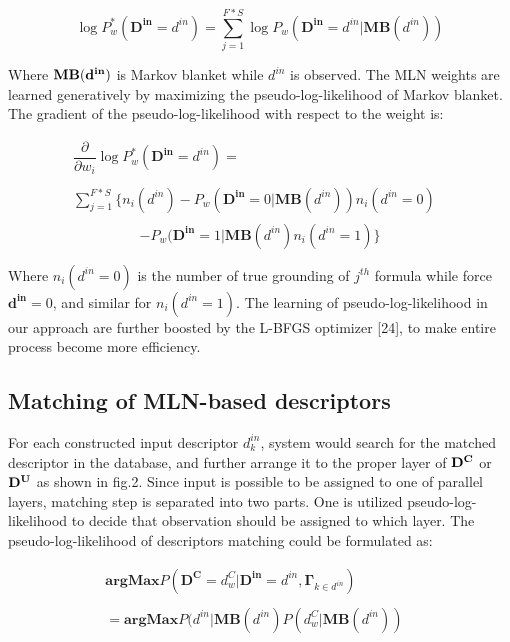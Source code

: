 \documentclass[journal]{IEEEtran}
\begin{document}
\begin{equation}
\log P^*_w(\mathbf{D^{in}} = d^{in}) = \sum_{j=1}^{F*S} \log P_{w}(\mathbf{D^{in}} = d^{in}|\mathbf{MB}(d^{in}))
\end{equation}

Where $\bf{MB}(d^{in})$ is Markov blanket while $d^{in}$ is observed. The MLN weights are learned generatively by maximizing the pseudo-log-likelihood of Markov blanket. The gradient of the pseudo-log-likelihood with respect to the weight is:

\begin{displaymath}
\begin{array}{ll}
\dfrac{\partial}{\partial w_i}\log P^*_w(\mathbf{D^{in}} = d^{in})= &\\\\
\sum^{F*S}_{j=1}\{n_i(d^{in})-P_w(\mathbf{D^{in}}=0|\mathbf{MB}(d^{in}))n_i(d^{in}=0) &\\
\end{array}
\end{displaymath}
\begin{equation}
-P_w(\mathbf{D^{in}}=1|\mathbf{MB}(d^{in})n_i(d^{in}=1)\}
\end{equation}

Where $n_i(d^{in}=0)$ is the number of true grounding of $j^{th}$ formula while force $\mathbf{d^{in}}=0$, and similar for $n_i(d^{in}=1)$. The learning of pseudo-log-likelihood in our approach are further boosted by the L-BFGS optimizer [24], to make entire process become more efficiency.

\subsection{Matching of MLN-based descriptors}
For each constructed input descriptor $d^{in}_k$, system would search for the matched descriptor in the database, and further arrange it to the proper layer of $\bf{D^C}$ or $\bf{D^U}$ as shown in fig.2. Since input is possible to be assigned to one of parallel layers, matching step is separated into two parts. One is utilized pseudo-log-likelihood to decide that observation should be assigned to which layer. The pseudo-log-likelihood of descriptors matching could be formulated as:


\begin{equation}
\begin{array}{ll}

\mathbf{argMax}P(\mathbf{D^C} = d^C_w  | \mathbf{D^{in}} = d^{in} , \mathbf{\Gamma}_{k \in {d^{in}}}) &\\\\
= \mathbf{argMax}P(d^{in} | \mathbf{MB}(d^{in}){P(d^{C}_w | \mathbf{MB}(d^{in}))}
\end{array}
\end{equation}
\end{document}
